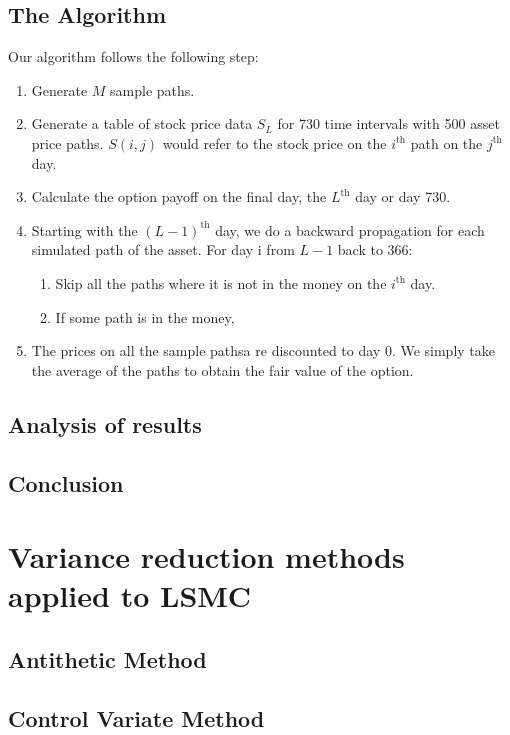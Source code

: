 \documentclass[12pt]{article}
\begin{document}
\subsection{The Algorithm}

Our algorithm follows the following step:

\begin{enumerate}
\item Generate $M$ sample paths.
\item Generate a table of stock price data $S_L$ for 730 time intervals with 500 asset price paths. $S(i,j)$ would refer to the stock price on the $i^\text{th}$ path on the $j^\text{th}$ day.
\item Calculate the option payoff on the final day, the $L^\text{th}$ day or day 730.
\item Starting with the $(L-1)^\text{th}$ day, we do a backward propagation for each simulated path of the asset. For day i from $L-1$ back to 366:
	\begin{enumerate}
	\item Skip all the paths where it is not in the money on the $i^\text{th}$ day.
	\item If some path is in the money, 
	\end{enumerate}
\item The prices on all the sample pathsa re discounted to day 0. We simply take the average of the paths to obtain the fair value of the option.
\end{enumerate}

\subsection{Analysis of results}

\subsection{Conclusion}

\section{Variance reduction methods applied to LSMC}

\subsection{Antithetic Method}

\subsection{Control Variate Method}
\end{document}
